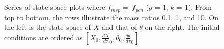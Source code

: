 \documentclass[12pt]{article}
\begin{document}
\begin{figure}
    \centering
     \\
     \\
    \caption{\small{Series of state space plots where $f_{msp} = \ f_{pen}$ ($g$ = 1, $k$ = 1). From top to bottom, the rows illustrate the mass ratios 0.1, 1, and 10. On the left is the state space of $X$ and that of $\theta$ on the right. The initial conditions are ordered as $[X_0, \frac{dX}{d\tau}_0, \theta_0, \frac{d\theta}{d\tau}_0]$.}}
    \label{fig:mixed-mode}
\end{figure}
\end{document}
